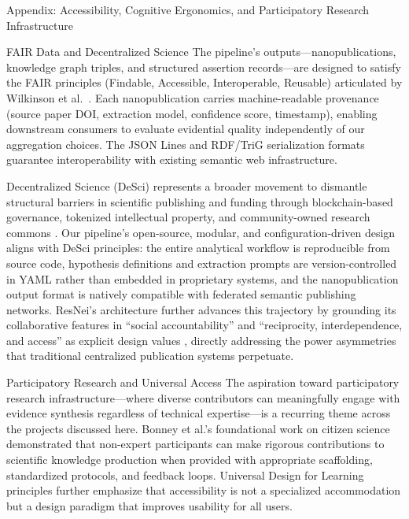 \documentclass[
  ignorenonframetext,
]{beamer}
\begin{document}
\begin{frame}{Appendix: Accessibility, Cognitive Ergonomics, and
Participatory Research Infrastructure \label{sec:accessibility}}
\begin{block}{FAIR Data and Decentralized Science}
\protect{}\label{fair-data-and-decentralized-science}
The pipeline's outputs---nanopublications, knowledge graph triples, and
structured assertion records---are designed to satisfy the FAIR
principles (Findable, Accessible, Interoperable, Reusable) articulated
by Wilkinson et al.~\citep{wilkinson2016fair}. Each nanopublication
carries machine-readable provenance (source paper DOI, extraction model,
confidence score, timestamp), enabling downstream consumers to evaluate
evidential quality independently of our aggregation choices. The JSON
Lines and RDF/TriG serialization formats guarantee interoperability with
existing semantic web infrastructure.

Decentralized Science (DeSci) represents a broader movement to dismantle
structural barriers in scientific publishing and funding through
blockchain-based governance, tokenized intellectual property, and
community-owned research commons \citep{hamburg2021desci}. Our
pipeline's open-source, modular, and configuration-driven design aligns
with DeSci principles: the entire analytical workflow is reproducible
from source code, hypothesis definitions and extraction prompts are
version-controlled in YAML rather than embedded in proprietary systems,
and the nanopublication output format is natively compatible with
federated semantic publishing networks. ResNei's architecture further
advances this trajectory by grounding its collaborative features in
``social accountability'' and ``reciprocity, interdependence, and
access'' as explicit design values \citep{lumiruusu2025resnei}, directly
addressing the power asymmetries that traditional centralized
publication systems perpetuate.
\end{block}

\begin{block}{Participatory Research and Universal Access}
\protect{}\label{participatory-research-and-universal-access}
The aspiration toward participatory research infrastructure---where
diverse contributors can meaningfully engage with evidence synthesis
regardless of technical expertise---is a recurring theme across the
projects discussed here. Bonney et al.'s foundational work on citizen
science \citep{bonney2009citizen} demonstrated that non-expert
participants can make rigorous contributions to scientific knowledge
production when provided with appropriate scaffolding, standardized
protocols, and feedback loops. Universal Design for Learning principles
\citep{rose2000universal} further emphasize that accessibility is not a
specialized accommodation but a design paradigm that improves usability
for all users.


\end{block}
\end{frame}
\end{document}
